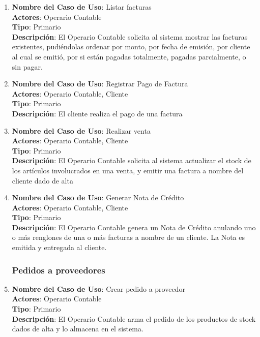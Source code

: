 \documentclass[12pt]{extarticle}
\begin{document}
\begin{spacing}{1.2}
\begin{enumerate}
        \item 	\textbf{Nombre del Caso de Uso}: Listar facturas\\
                \textbf{Actores}: Operario Contable\\
                \textbf{Tipo}: Primario\\
                \textbf{Descripción}: El Operario Contable solicita al sistema mostrar las facturas existentes, pudiéndolas ordenar por monto, por fecha de emisión, por cliente al cual se emitió, por si están pagadas totalmente, pagadas parcialmente, o sin pagar.

        \item 	\textbf{Nombre del Caso de Uso}: Registrar Pago de Factura\\
                \textbf{Actores}: Operario Contable, Cliente\\
                \textbf{Tipo}: Primario\\
                \textbf{Descripción}: El cliente realiza el pago de una factura
        
        \item 	\textbf{Nombre del Caso de Uso}: Realizar venta\\
                \textbf{Actores}: Operario Contable, Cliente\\
                \textbf{Tipo}: Primario\\
                \textbf{Descripción}: El Operario Contable solicita al sistema actualizar el stock de los artículos involucrados en una venta, y emitir una factura a nombre del cliente dado de alta

        \item 	\textbf{Nombre del Caso de Uso}: Generar Nota de Crédito\\
                \textbf{Actores}: Operario Contable, Cliente\\
                \textbf{Tipo}: Primario\\
                \textbf{Descripción}: El Operario Contable genera un Nota de Crédito anulando uno o más renglones de una o más facturas a nombre de un cliente. La Nota es emitida y entregada al cliente.



        \subsubsection{Pedidos a proveedores}



        \item 	\textbf{Nombre del Caso de Uso}: Crear pedido a proveedor\\
                \textbf{Actores}: Operario Contable\\
                \textbf{Tipo}: Primario\\
                \textbf{Descripción}: El Operario Contable arma el pedido de los productos de stock dados de alta y lo almacena en el sistema.


\end{enumerate}
\end{spacing}
\end{document}
